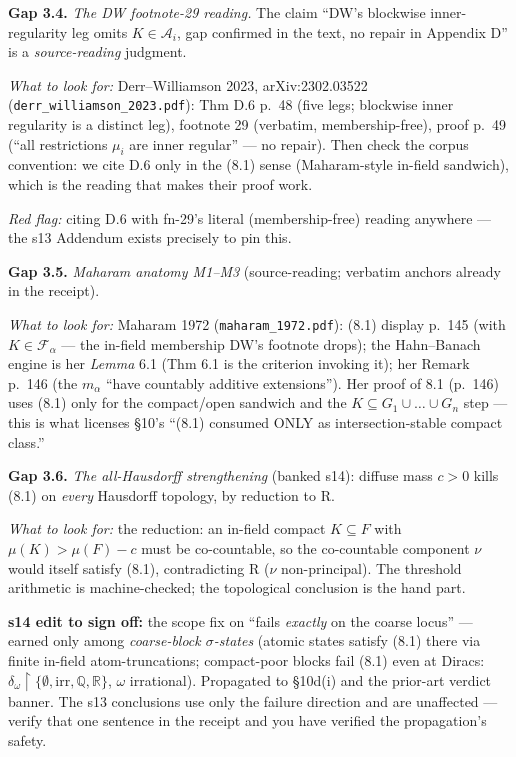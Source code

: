 \documentclass[11pt]{article}
\newcommand{\file}[1]{\texttt{\small #1}}
\newcommand{\gap}[1]{\medskip\noindent\textbf{Gap #1.}}
\newcommand{\lookfor}{\par\smallskip\noindent\emph{What to look for:} }
\newcommand{\redflag}{\par\smallskip\noindent\emph{Red flag:} }
\begin{document}
\gap{3.4} \emph{The DW footnote-29 reading.} The claim ``DW's
blockwise inner-regularity leg omits $K \in \mathcal A_i$, gap
confirmed in the text, no repair in Appendix D'' is a
\emph{source-reading} judgment.
\lookfor Derr--Williamson 2023, arXiv:2302.03522
(\file{derr\_williamson\_2023.pdf}): Thm D.6 p.~48 (five legs;
blockwise inner regularity is a distinct leg), footnote 29 (verbatim,
membership-free), proof p.~49 (``all restrictions $\mu_i$ are inner
regular'' --- no repair). Then check the corpus convention: we cite
D.6 only in the (8.1) sense (Maharam-style in-field sandwich), which
is the reading that makes their proof work.
\redflag citing D.6 with fn-29's literal (membership-free) reading
anywhere --- the s13 Addendum exists precisely to pin this.

\gap{3.5} \emph{Maharam anatomy M1--M3} (source-reading; verbatim
anchors already in the receipt).
\lookfor Maharam 1972 (\file{maharam\_1972.pdf}): (8.1) display
p.~145 (with $K \in \mathcal F_\alpha$ --- the in-field membership DW's
footnote drops); the Hahn--Banach engine is her \emph{Lemma} 6.1 (Thm
6.1 is the criterion invoking it); her Remark p.~146 (the $m_\alpha$
``have countably additive extensions''). Her proof of 8.1 (p.~146)
uses (8.1) only for the compact/open sandwich and the $K \subseteq
G_1 \cup \dots \cup G_n$ step --- this is what licenses \S10's
``(8.1) consumed ONLY as intersection-stable compact class.''

\gap{3.6} \emph{The all-Hausdorff strengthening} (banked s14): diffuse
mass $c > 0$ kills (8.1) on \emph{every} Hausdorff topology, by
reduction to R.
\lookfor the reduction: an in-field compact $K \subseteq F$ with
$\mu(K) > \mu(F) - c$ must be co-countable, so the co-countable
component $\nu$ would itself satisfy (8.1), contradicting R ($\nu$
non-principal). The threshold arithmetic is machine-checked; the
topological conclusion is the hand part.

\smallskip\noindent\textbf{s14 edit to sign off:} the scope fix on
``fails \emph{exactly} on the coarse locus'' --- earned only among
\emph{coarse-block $\sigma$-states} (atomic states satisfy (8.1) there
via finite in-field atom-truncations; compact-poor blocks fail (8.1)
even at Diracs: $\delta_\omega\!\restriction\!\{\emptyset,
\mathrm{irr}, \mathbb Q, \mathbb R\}$, $\omega$ irrational).
Propagated to \S10d(i) and the prior-art verdict banner. The s13
conclusions use only the failure direction and are unaffected ---
verify that one sentence in the receipt and you have verified the
propagation's safety.
\end{document}
